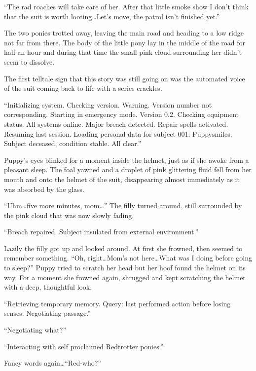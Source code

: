 ``The rad roaches will take care of her. After that little smoke show I don't think that the suit is worth looting\dots Let's move, the patrol isn't finished yet.''

The two ponies trotted away, leaving the main road and heading to a low ridge not far from there. The body of the little pony lay in the middle of the road for half an hour and during that time the small pink cloud surrounding her didn't seem to dissolve.

\horizonline


The first telltale sign that this story was still going on was the automated voice of the suit coming back to life with a series crackles.

``{\mt Initializing system. Checking version. Warning. Version number not corresponding. Starting in emergency mode. Version 0.2. Checking equipment status. All systems online. Major breach detected. Repair spells activated. Resuming last session. Loading personal data for subject 001: Puppysmiles. Subject deceased, condition stable. All clear.}''

Puppy's eyes blinked for a moment inside the helmet, just as if she awoke from a pleasant sleep. The foal yawned and a droplet of pink glittering fluid fell from her mouth and onto the helmet of the suit, disappearing almost immediately as it was absorbed by the glass.

``Uhm\dots five more minutes, mom\dots'' The filly turned around, still surrounded by the pink cloud that was now slowly fading.

``{\mt Breach repaired. Subject insulated from external environment.}''

Lazily the filly got up and looked around. At first she frowned, then seemed to remember something. ``Oh, right\dots Mom's not here\dots What was I doing before going to sleep?'' Puppy tried to scratch her head but her hoof found the helmet on its way. For a moment she frowned again, shrugged and kept scratching the helmet with a deep, thoughtful look.

``{\mt Retrieving temporary memory. Query: last performed action before losing senses. Negotiating passage.}''

``Negotiating what?''

``{\mt Interacting with self proclaimed Redtrotter ponies.}''

Fancy words again\dots ``Red-who?''

